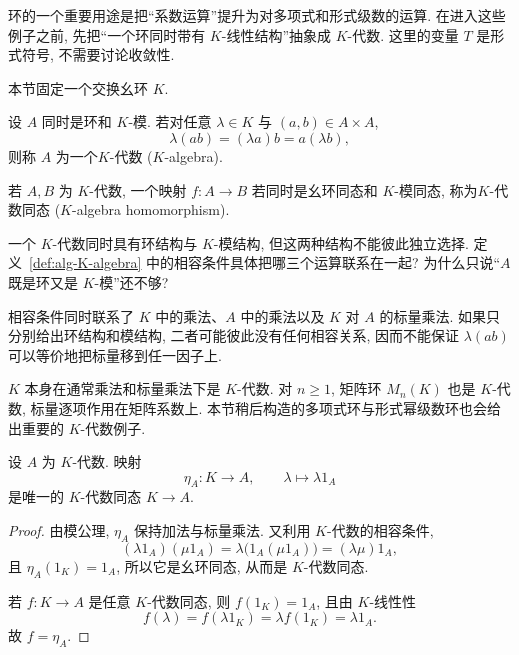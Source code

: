 \documentclass[usesamecnt, thmcnt=section, lang=cn, newtx, 10pt, scheme=chinese]{elegantbook}
\begin{document}
环的一个重要用途是把``系数运算''提升为对多项式和形式级数的运算. 在进入这些例子之前, 先把``一个环同时带有 $K$-线性结构''抽象成 $K$-代数. 这里的变量 $T$ 是形式符号, 不需要讨论收敛性.

本节固定一个交换幺环 $K$.

\begin{definition}[$K$-代数]\label{def:alg-K-algebra}
设 $A$ 同时是环和 $K$-模. 若对任意 $\lambda\in K$ 与 $(a,b)\in A\times A$,
\[
 \lambda(ab)=(\lambda a)b=a(\lambda b),
\]
则称 $A$ 为一个{\color{blue}$K$-代数 ($K$-algebra)}.

若 $A,B$ 为 $K$-代数, 一个映射 $f:A\to B$ 若同时是幺环同态和 $K$-模同态, 称为{\color{blue}$K$-代数同态 ($K$-algebra homomorphism)}.
\end{definition}

\begin{concept}\label{con:alg-K-algebra-01}
一个 $K$-代数同时具有环结构与 $K$-模结构, 但这两种结构不能彼此独立选择. 定义~\ref{def:alg-K-algebra} 中的相容条件具体把哪三个运算联系在一起? 为什么只说``$A$ 既是环又是 $K$-模''还不够?
\end{concept}

\begin{solution}
相容条件同时联系了 $K$ 中的乘法、$A$ 中的乘法以及 $K$ 对 $A$ 的标量乘法. 如果只分别给出环结构和模结构, 二者可能彼此没有任何相容关系, 因而不能保证 $\lambda(ab)$ 可以等价地把标量移到任一因子上.
\end{solution}

\begin{instance}
$K$ 本身在通常乘法和标量乘法下是 $K$-代数. 对 $n\geq1$, 矩阵环 $M_n(K)$ 也是 $K$-代数, 标量逐项作用在矩阵系数上. 本节稍后构造的多项式环与形式幂级数环也会给出重要的 $K$-代数例子.
\end{instance}

\begin{proposition}\label{prop:alg-K-algebra-canonical}
设 $A$ 为 $K$-代数. 映射
\[
 \eta_A:K\longrightarrow A,
 \qquad
 \lambda\longmapsto \lambda1_A
\]
是唯一的 $K$-代数同态 $K\to A$.
\end{proposition}

\begin{proof}
由模公理, $\eta_A$ 保持加法与标量乘法. 又利用 $K$-代数的相容条件,
\[
 (\lambda1_A)(\mu1_A)
 =\lambda\bigl(1_A(\mu1_A)\bigr)
 =(\lambda\mu)1_A,
\]
且 $\eta_A(1_K)=1_A$, 所以它是幺环同态, 从而是 $K$-代数同态.

若 $f:K\to A$ 是任意 $K$-代数同态, 则 $f(1_K)=1_A$, 且由 $K$-线性性
\[
 f(\lambda)=f(\lambda1_K)=\lambda f(1_K)=\lambda1_A.
\]
故 $f=\eta_A$.
\end{proof}
\end{document}
